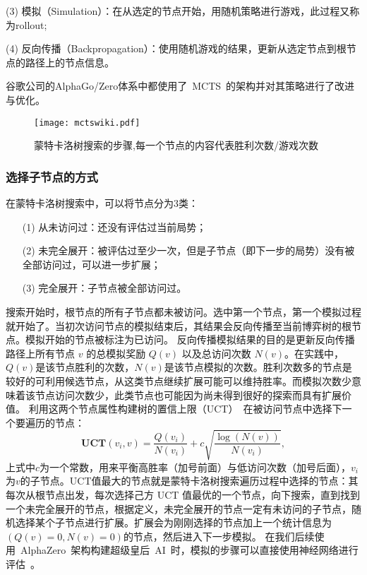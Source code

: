 (3) 模拟（Simulation）：在从选定的节点开始，用随机策略进行游戏，此过程又称为rollout;

(4) 反向传播（Backpropagation）：使用随机游戏的结果，更新从选定节点到根节点的路径上的节点信息。

谷歌公司的AlphaGo/Zero体系中都使用了~MCTS~的架构并对其策略进行了改进与优化。

\begin{figure}[htb]
    \centering
    \texttt{[image: mctswiki.pdf]}
    \caption[mcts]{%
    蒙特卡洛树搜索的步骤,每一个节点的内容代表胜利次数/游戏次数~\cite{RePEc:wsi:nmncxx:v:04:y:2008:i:03:n:s1793005708001094}%
      }
    \label{fig:mcts}
\end{figure}

\subsubsection{选择子节点的方式}
在蒙特卡洛树搜索中，可以将节点分为3类：

\begin{itemize}
    \item [(1)] 
    从未访问过：还没有评估过当前局势；
    \item [(2)]
    未完全展开：被评估过至少一次，但是子节点（即下一步的局势）没有被全部访问过，可以进一步扩展；
    \item [(3)]
    完全展开：子节点被全部访问过。
\end{itemize}

搜索开始时，根节点的所有子节点都未被访问。选中第一个节点，第一个模拟过程就开始了。当初次访问节点的模拟结束后，其结果会反向传播至当前博弈树的根节点。模拟开始的节点被标注为已访问。
反向传播模拟结果的目的是更新反向传播路径上所有节点 $v$ 的总模拟奖励 $Q(v)$ 以及总访问次数 $N(v)$。在实践中，$Q(v)$是该节点胜利的次数，$N(v)$是该节点模拟的次数。胜利次数多的节点是较好的可利用候选节点，从这类节点继续扩展可能可以维持胜率。而模拟次数少意味着该节点访问次数少，此类节点也可能因为尚未得到很好的探索而具有扩展价值。
利用这两个节点属性构建树的置信上限（UCT）~\cite{10.1007/11871842_29}在被访问节点中选择下一个要遍历的节点：
\begin{equation*}
    \textbf{UCT}(v_{i},v) = \frac{Q(v_{i})}{N(v_{i})} + c\sqrt{\frac{\log(N(v))}{N(v_{i})}},
\end{equation*}
上式中$c$为一个常数，用来平衡高胜率（加号前面）与低访问次数（加号后面），$v_{i}$为$v$的子节点。UCT值最大的节点就是蒙特卡洛树搜索遍历过程中选择的节点：其每次从根节点出发，每次选择己方 UCT 值最优的一个节点，向下搜索，直到找到一个未完全展开的节点，根据定义，未完全展开的节点一定有未访问的子节点，随机选择某个子节点进行扩展。扩展会为刚刚选择的节点加上一个统计信息为$(Q(v)=0,N(v)=0)$的节点，然后进入下一步模拟。
在我们后续使用~AlphaZero~架构构建超级皇后~AI~时，模拟的步骤可以直接使用神经网络进行评估~\cite{Silver1140,Silver2017,Silver2016}。

